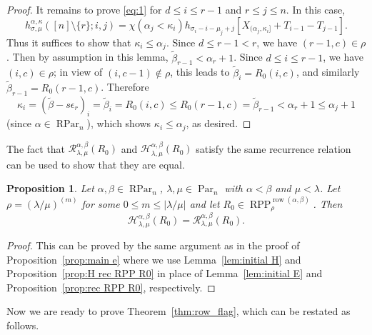 \documentclass[12pt]{amsart}
\numberwithin{equation}{section}
\newtheorem{prop}[thm]{Proposition}
\theoremstyle{definition}
\newcommand\wb{\widetilde{\beta}}
\newcommand\row{\operatorname{row}}
\newcommand\Par{\operatorname{Par}}
\newcommand\RPar{\operatorname{RPar}}
\newcommand\RPP{\operatorname{RPP}}
\newcommand\lm{{\lambda/\mu}}
\newcommand\R{\mathcal{R}}
\newcommand\HH{\mathcal{H}}
\begin{document}
\begin{proof}
It remains to prove \eqref{eq:1} for $d\le i\le r-1$ and $r\le j\le n$. 
In this case,
\[
      h^{\alpha,\kappa}_{\sigma,\mu}([n]\setminus\{r\};i,j)=
      \chi(\alpha_j<\kappa_i) h_{\sigma_i-i-\mu_j+j}[X_{(\alpha_j,\kappa_i]} + T_{i-1}-T_{j-1}].
\]
Thus it suffices to show that $\kappa_i\le\alpha_j$. Since $d\le r-1<r$, we have
$(r-1,c)\in \rho$. Then by assumption in this lemma, $\wb_{r-1}<\alpha_r+1$.
Since $d\le i\le r-1$, we have $(i,c)\in\rho$;
in view of $(i,c-1)\notin\rho$, this leads to $\wb_i = R_0(i,c)$, and
similarly $\wb_{r-1} = R_0(r-1,c)$. Therefore
\[
\kappa_i = (\wb-s\epsilon_r)_i = \wb_i = R_0(i,c) \le R_0(r-1,c) = \wb_{r-1}<
\alpha_r+1 \le \alpha_j+1
\]
(since $\alpha \in \RPar_n$),
which shows $\kappa_i\le\alpha_j$, as desired.
\end{proof}

The fact that $\R^{\alpha,\beta}_{\lambda,\mu}(R_0)$ and
$\HH^{\alpha,\beta}_{\lambda,\mu}(R_0)$ satisfy the same recurrence relation can
be used to show that they are equal.


\begin{prop}\label{prop:main h}
  Let $\alpha,\beta\in\RPar_n$, $\lambda,\mu\in\Par_n$ with $\alpha<\beta$ and
  $\mu<\lambda$. Let $\rho=(\lm)^{(m)}$ for some $0\le m\le|\lm|$ and let
  $R_0\in \RPP^{\row(\alpha,\beta)}_{\rho}$. Then
\[
\HH^{\alpha,\beta}_{\lambda,\mu}(R_0) = \R^{\alpha,\beta}_{\lambda,\mu}(R_0). 
\]
\end{prop}
\begin{proof}
  This can be proved by the same argument as in the proof of
  Proposition~\ref{prop:main e} where we use Lemma~\ref{lem:initial H} and
  Proposition~\ref{prop:H rec RPP R0} in place of Lemma~\ref{lem:initial E} and
  Proposition~\ref{prop:rec RPP R0}, respectively.
\end{proof}



Now we are ready to prove Theorem~\ref{thm:row_flag}, which can be restated as
follows. 
\end{document}
